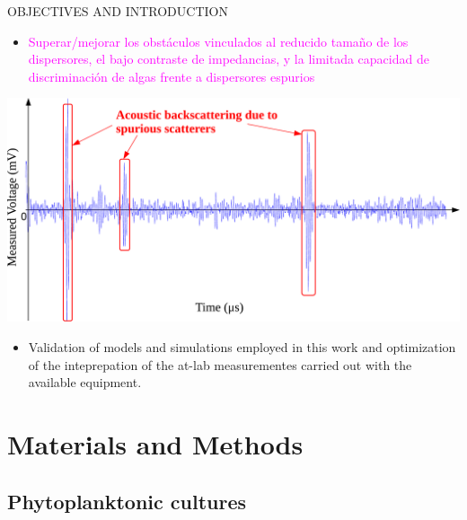 \documentclass[handout]{beamer}
\begin{document}
\begin{frame}{OBJECTIVES AND INTRODUCTION}
		\vspace{2px}
		\begin{minipage}[c]{1\linewidth}
		\begin{minipage}[c]{0.45\linewidth}
			\begin{itemize}
				\item \textcolor{magenta}{Superar/mejorar los obstáculos vinculados al reducido tamaño de los dispersores, el bajo contraste de impedancias, y la limitada capacidad de discriminación de algas frente a dispersores espurios}
			\end{itemize}
		\end{minipage}
		\hspace{1px}
		\begin{minipage}[c]{0.53\linewidth}
			 {\centering \includegraphics[width=0.4\paperwidth]{./imagenes/respuestones}}
		\end{minipage}
		
		\vspace{2px}
%				
		\end{minipage}
		
		\begin{itemize}		
		\item Validation of models and simulations employed in this work and optimization of the inteprepation of the at-lab measurementes carried out with the available equipment.
		\end{itemize}
		
\end{frame}

\section{Materials and Methods}

\subsection{Phytoplanktonic cultures}
\end{document}
